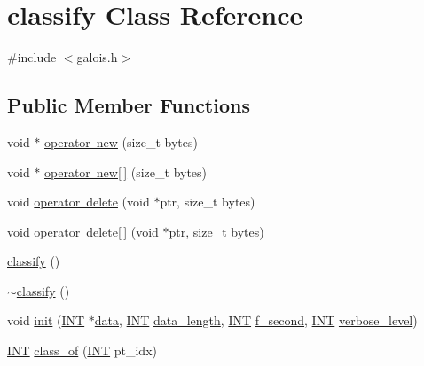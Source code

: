 \hypertarget{classclassify}{}\section{classify Class Reference}
\label{classclassify}


{\ttfamily \#include $<$galois.\+h$>$}

\subsection*{Public Member Functions}
\begin{DoxyCompactItemize}
\item 
void $\ast$ \mbox{\hyperlink{classclassify_a8aff5842dba0201a8cfafff585e28afc}{operator new}} (size\+\_\+t bytes)
\item 
void $\ast$ \mbox{\hyperlink{classclassify_aae4d9bef04d19d137461fe20a1e9fa4d}{operator new\mbox{[}$\,$\mbox{]}}} (size\+\_\+t bytes)
\item 
void \mbox{\hyperlink{classclassify_aca1973594095f37cdb8e48f9d4f2d81f}{operator delete}} (void $\ast$ptr, size\+\_\+t bytes)
\item 
void \mbox{\hyperlink{classclassify_a2b06726b89c7e487e35614a771cabe71}{operator delete\mbox{[}$\,$\mbox{]}}} (void $\ast$ptr, size\+\_\+t bytes)
\item 
\mbox{\hyperlink{classclassify_ae35e10397862d6e00e631dcc9290157c}{classify}} ()
\item 
\mbox{\hyperlink{classclassify_a26f049c310cdf63bb7f2fc3d56a04b20}{$\sim$classify}} ()
\item 
void \mbox{\hyperlink{classclassify_afc24c64267d646d1f83ea39a7c66bde3}{init}} (\mbox{\hyperlink{galois_8h_a09fddde158a3a20bd2dcadb609de11dc}{I\+NT}} $\ast$\mbox{\hyperlink{classclassify_a62862de3f6e8d1191cfdbb0af6ecfb8d}{data}}, \mbox{\hyperlink{galois_8h_a09fddde158a3a20bd2dcadb609de11dc}{I\+NT}} \mbox{\hyperlink{classclassify_ab158a9b2f44f53932642a53bec3c4cc3}{data\+\_\+length}}, \mbox{\hyperlink{galois_8h_a09fddde158a3a20bd2dcadb609de11dc}{I\+NT}} \mbox{\hyperlink{classclassify_aa6e463ded1524ed187815a48754f6fbc}{f\+\_\+second}}, \mbox{\hyperlink{galois_8h_a09fddde158a3a20bd2dcadb609de11dc}{I\+NT}} \mbox{\hyperlink{simeon_8_c_a818073fbcc2f439e7c56952f67386122}{verbose\+\_\+level}})
\item 
\mbox{\hyperlink{galois_8h_a09fddde158a3a20bd2dcadb609de11dc}{I\+NT}} \mbox{\hyperlink{classclassify_ab8ba8d56b1c2dc9eece95ca486cd53c4}{class\+\_\+of}} (\mbox{\hyperlink{galois_8h_a09fddde158a3a20bd2dcadb609de11dc}{I\+NT}} pt\+\_\+idx)

\end{DoxyCompactItemize}
